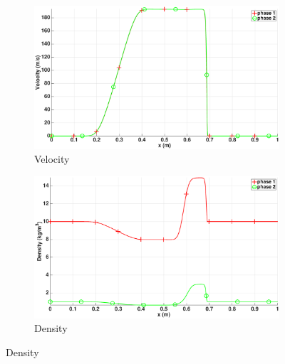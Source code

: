 \begin{figure}[H]
        \centering
        \begin{subfigure}[b]{0.5\textwidth}
                \centering
                \includegraphics[width=\textwidth]{figures/relaxation_two_phases_velocity.eps}                
                \caption{Velocity}
                \label{fig:two-phase-vel}
        \end{subfigure}%
        \begin{subfigure}[b]{0.5\textwidth}
                \centering
                \includegraphics[width=\textwidth]{figures/relaxation_two_phases_density.eps}
                \caption{Density}
                \label{fig:two-phase-density}
        \end{subfigure}
        

\end{figure}
